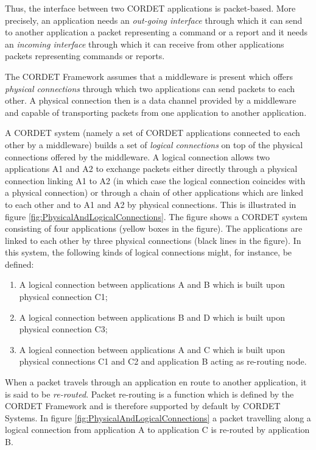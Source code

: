 \documentclass{pnp_article}
\begin{document}
Thus, the interface between two CORDET applications is packet-based. More precisely, an application needs an \textit{out-going interface} through which it can send to another application a packet representing a command or a report and it needs an \textit{incoming interface} through which it can receive from other applications packets representing commands or reports.  

The CORDET Framework assumes that a middleware is present which offers \textit{physical connections} through which two applications can send packets to each other. A physical connection then is a data channel provided by a middleware and capable of transporting packets from one application to another application. 

A CORDET system (namely a set of CORDET applications connected to each other by a middleware) builds a set of \textit{logical connections} on top of the physical connections offered by the middleware. A logical connection allows two applications A1 and A2 to exchange packets either directly through a physical connection linking A1 to A2 (in which case the logical connection coincides with a physical connection) or through a chain of other applications which are linked to each other and to A1 and A2 by physical connections. This is illustrated in figure \ref{fig:PhysicalAndLogicalConnections}. The figure shows a CORDET system consisting of four applications (yellow boxes in the figure). The applications are linked to each other by three physical connections (black lines in the figure). In this system, the following kinds of logical connections might, for instance, be defined:

\begin{enumerate}
\item A logical connection between applications A and B which is built upon physical connection C1;
\item A logical connection between applications B and D which is built upon physical connection C3;
\item A logical connection between applications A and C which is built upon physical connections C1 and C2 and application B acting as re-routing node.
\end{enumerate}

When a packet travels through an application en route to another application, it is said to be \textit{re-routed}. Packet re-routing is a function which is defined by the CORDET Framework and is therefore supported by default by CORDET Systems. In figure \ref{fig:PhysicalAndLogicalConnections} a packet travelling along a logical connection from application A to application C is re-routed by application B.
\end{document}
